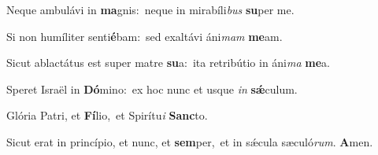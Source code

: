 Neque ambulávi in \textbf{ma}gnis:~\redgreheightstar neque in mirabíli\textit{bus} \textbf{su}per me.

Si non humíliter senti\textbf{é}bam:~\redgreheightstar sed exaltávi áni\textit{mam} \textbf{me}am.

Sicut ablactátus est super matre \textbf{su}a:~\redgreheightstar ita retribútio in áni\textit{ma} \textbf{me}a.

Speret Israël in \textbf{Dó}mino:~\redgreheightstar ex hoc nunc et usque \textit{in} \textbf{sǽ}culum.

Glória Patri, et \textbf{Fí}lio,~\redgreheightstar et Spirítu\textit{i} \textbf{Sanc}to.

Sicut erat in princípio, et nunc, et \textbf{sem}per,~\redgreheightstar et in sǽcula sæculó\textit{rum}. \textbf{A}men.


